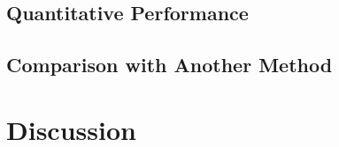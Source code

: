 \subsection{Quantitative Performance}
\subsection{Comparison with Another Method}
\section{Discussion}



%
